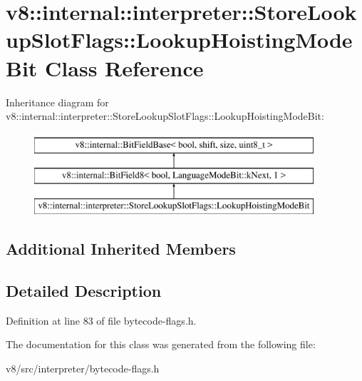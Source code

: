 \hypertarget{classv8_1_1internal_1_1interpreter_1_1StoreLookupSlotFlags_1_1LookupHoistingModeBit}{}\section{v8\+:\+:internal\+:\+:interpreter\+:\+:Store\+Lookup\+Slot\+Flags\+:\+:Lookup\+Hoisting\+Mode\+Bit Class Reference}
\label{classv8_1_1internal_1_1interpreter_1_1StoreLookupSlotFlags_1_1LookupHoistingModeBit}
Inheritance diagram for v8\+:\+:internal\+:\+:interpreter\+:\+:Store\+Lookup\+Slot\+Flags\+:\+:Lookup\+Hoisting\+Mode\+Bit\+:\begin{figure}[H]
\begin{center}
\leavevmode
\includegraphics[height=3.000000cm]{classv8_1_1internal_1_1interpreter_1_1StoreLookupSlotFlags_1_1LookupHoistingModeBit}
\end{center}
\end{figure}
\subsection*{Additional Inherited Members}


\subsection{Detailed Description}


Definition at line 83 of file bytecode-\/flags.\+h.



The documentation for this class was generated from the following file\+:\begin{DoxyCompactItemize}
\item 
v8/src/interpreter/bytecode-\/flags.\+h\end{DoxyCompactItemize}
